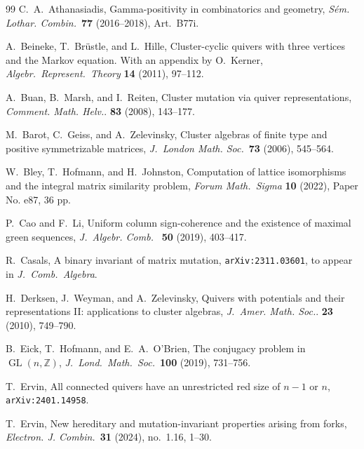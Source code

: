 \documentclass[11pt, letterpaper]{amsart}
\theoremstyle{definition}
\numberwithin{equation}{section}
\def\GL{{\operatorname{GL}}}
\begin{document}
\begin{thebibliography}{99}
C.~A.~Athanasiadis,
Gamma-positivity in combinatorics and geometry,
\textsl{S\'em. Lothar. Combin.}\ \textbf{77} (2016--2018), Art.~B77i.

A.~Beineke, T.~Br\"ustle, and L.~Hille, 
Cluster-cyclic quivers with three vertices and the Markov equation. 
With an appendix by O.~Kerner, 
\textsl{Algebr.\ Represent.\ Theory} \textbf{14} (2011), 97--112. 

A.~Buan, B.~Marsh, and I.~Reiten, 
Cluster mutation via quiver representations, 
{\em Comment. Math. Helv.}. \textbf{83} (2008), 143--177.

M.~Barot, C.~Geiss, and A.~Zelevinsky, 
Cluster algebras of finite type and positive symmetrizable matrices,  
\textsl{J.~London Math. Soc.}\ \textbf{73} (2006), 545--564. 

W.~Bley, T.~Hofmann, and H.~Johnston, 
Computation of lattice isomorphisms and the integral matrix similarity problem, 
\textsl{Forum Math.\ Sigma} \textbf{10} (2022), Paper No. e87, 36 pp.

 P.~Cao and F.~Li, 
Uniform column sign-coherence and the existence of maximal green sequences,
\textsl{J.~Algebr. Comb.} \ \textbf{50} (2019), 403--417. 

R.~Casals,
A binary invariant of matrix mutation, 
\texttt{arXiv:2311.03601}, 
to appear in \textsl{J.~Comb.\ Algebra}. 

H.~Derksen, J.~Weyman, and A.~Zelevinsky,
Quivers with potentials and their representations II: applications to cluster algebras,
\textsl{J.~Amer. Math. Soc.}. \textbf{23} (2010), 749--790. %

B.~Eick, T.~Hofmann, and E.~A.~O'Brien, 
The conjugacy problem in $\GL(n,\mathbb{Z})$, 
\textsl{J.~Lond.\ Math.\ Soc.}\ \textbf{100} (2019), 731--756.

T.~Ervin,
All connected quivers have an unrestricted red size of $n-1$ or $n$,
\texttt{arXiv:2401.14958}.

T.~Ervin, 
New hereditary and mutation-invariant properties arising from forks,
\textsl{Electron. J. Combin.}\ \textbf{31} (2024), no.~1.16, 1--30.


\end{thebibliography}
\end{document}
